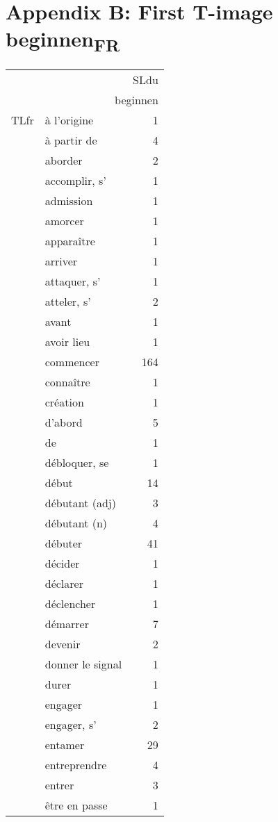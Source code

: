\section*{Appendix B: First T-image beginnen\textsubscript{FR}}
{\noindent
\small
\begin{tabularx}{.45\textwidth}{llr} 
&& SLdu\\
\hhline{~~-} &\multicolumn{2}{r}{beginnen}\\
\multicolumn{1}{c}{TLfr} & à l'origine &  1\\
& à partir de &  4\\
& aborder &  2\\
& accomplir, s' &  1\\
& admission &  1\\
& amorcer &  1\\
& apparaître &  1\\
& arriver &  1\\
& attaquer, s' &  1\\
& atteler, s' &  2\\
& avant &  1\\
& avoir lieu &  1\\
& commencer &  164\\
& connaître &  1\\
& création &  1\\
& d'abord &  5\\
& de &  1\\
& débloquer, se &  1\\
& début &  14\\
& débutant (adj) &  3\\
& débutant (n) &  4\\
& débuter &  41\\
& décider &  1\\
& déclarer &  1\\
& déclencher &  1\\
& démarrer &  7\\
& devenir &  2\\
& donner le signal &  1\\
& durer &  1\\
& engager &  1\\
& engager, s' &  2\\
& entamer &  29\\
& entreprendre &  4\\
& entrer &  3\\
& être en passe &  1\\

\end{tabularx}}
